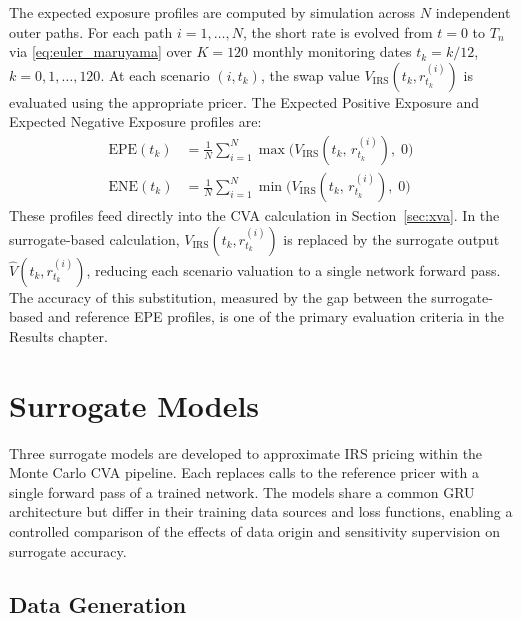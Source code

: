   The expected exposure profiles are computed by simulation across $N$
  independent outer paths. For each path $i = 1,\ldots,N$, the short rate
  is evolved from $t = 0$ to $T_n$ via \eqref{eq:euler_maruyama} over
  $K = 120$ monthly monitoring dates $t_k = k/12$, $k = 0,1,\ldots,120$.
  At each scenario $(i, t_k)$, the swap value $V_{\mathrm{IRS}}(t_k,
  r_{t_k}^{(i)})$ is evaluated using the appropriate pricer. The Expected
  Positive Exposure and Expected Negative Exposure profiles are:
  \begin{align}
    \mathrm{EPE}(t_k)
      &= \frac{1}{N}\sum_{i=1}^{N}
           \max\!\bigl(V_{\mathrm{IRS}}(t_k,\,r_{t_k}^{(i)}),\;0\bigr)
      \label{eq:epe} \\[4pt]
    \mathrm{ENE}(t_k)
      &= \frac{1}{N}\sum_{i=1}^{N}
           \min\!\bigl(V_{\mathrm{IRS}}(t_k,\,r_{t_k}^{(i)}),\;0\bigr)
      \label{eq:ene}
  \end{align}
  These profiles feed directly into the CVA calculation in
  Section~\ref{sec:xva}. In the surrogate-based calculation,
  $V_{\mathrm{IRS}}(t_k, r_{t_k}^{(i)})$ is replaced by the surrogate
  output $\hat{V}(t_k, r_{t_k}^{(i)})$, reducing each scenario valuation
  to a single network forward pass. The accuracy of this substitution,
  measured by the gap between the surrogate-based and reference EPE profiles,
  is one of the primary evaluation criteria in the Results chapter.


  \section{Surrogate Models}
  \label{sec:surrogates}

  Three surrogate models are developed to approximate IRS pricing within the
  Monte Carlo CVA pipeline. Each replaces calls to the reference pricer with a
  single forward pass of a trained network. The models share a common GRU
  architecture but differ in their training data sources and loss functions,
  enabling a controlled comparison of the effects of data origin and sensitivity
  supervision on surrogate accuracy.

  \subsection{Data Generation}
  \label{sec:data_gen}

